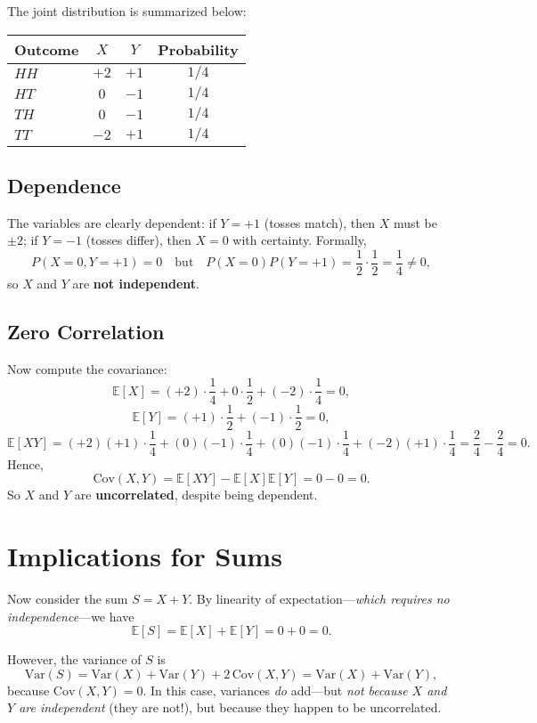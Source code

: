 \documentclass{article}
\begin{document}
The joint distribution is summarized below:


\begin{center}
\begin{tabular}{lccc}
\toprule
Outcome & $X$ & $Y$ & Probability \\
\midrule
$HH$ & $+2$ & $+1$ & $1/4$ \\
$HT$ & $0$  & $-1$ & $1/4$ \\
$TH$ & $0$  & $-1$ & $1/4$ \\
$TT$ & $-2$ & $+1$ & $1/4$ \\
\bottomrule
\end{tabular}
\end{center}

\subsection*{Dependence}
The variables are clearly dependent: if $Y = +1$ (tosses match), then $X$ must be $\pm 2$; if $Y = -1$ (tosses differ), then $X = 0$ with certainty. Formally,
\[
P(X = 0, Y = +1) = 0 \quad \text{but} \quad P(X = 0)P(Y = +1) = \frac{1}{2} \cdot \frac{1}{2} = \frac{1}{4} \ne 0,
\]
so $X$ and $Y$ are \textbf{not independent}.

\subsection*{Zero Correlation}
Now compute the covariance:
\[
\mathbb{E}[X] = (+2)\cdot\frac{1}{4} + 0\cdot\frac{1}{2} + (-2)\cdot\frac{1}{4} = 0,
\]
\[
\mathbb{E}[Y] = (+1)\cdot\frac{1}{2} + (-1)\cdot\frac{1}{2} = 0,
\]
\[
\mathbb{E}[XY] = (+2)(+1)\cdot\frac{1}{4} + (0)(-1)\cdot\frac{1}{4} + (0)(-1)\cdot\frac{1}{4} + (-2)(+1)\cdot\frac{1}{4} = \frac{2}{4} - \frac{2}{4} = 0.
\]
Hence,
\[
\mathrm{Cov}(X, Y) = \mathbb{E}[XY] - \mathbb{E}[X]\mathbb{E}[Y] = 0 - 0 = 0.
\]
So $X$ and $Y$ are \textbf{uncorrelated}, despite being dependent.

\section*{Implications for Sums}

Now consider the sum $S = X + Y$. By linearity of expectation—\textit{which requires no independence}—we have
\[
\mathbb{E}[S] = \mathbb{E}[X] + \mathbb{E}[Y] = 0 + 0 = 0.
\]

However, the variance of $S$ is
\[
\mathrm{Var}(S) = \mathrm{Var}(X) + \mathrm{Var}(Y) + 2\,\mathrm{Cov}(X, Y) = \mathrm{Var}(X) + \mathrm{Var}(Y),
\]
because $\mathrm{Cov}(X, Y) = 0$. In this case, variances \textit{do} add—but \textit{not because $X$ and $Y$ are independent} (they are not!), but because they happen to be uncorrelated.
\end{document}
